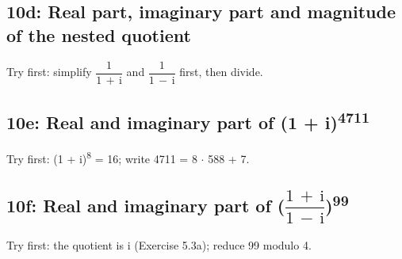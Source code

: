 \documentclass[11pt]{article}
\begin{document}
\begin{keepsection}
\begin{keepsection}
\end{keepsection}

\begin{keepsection}
\subsection{10d: Real part, imaginary part and magnitude of the nested quotient}

Try first: simplify {\small\ensuremath{\dfrac{1}{1\, +\, \mathrm{i}}}} and {\small\ensuremath{\dfrac{1}{1\, -\, \mathrm{i}}}} first, then divide.

\end{keepsection}

\begin{keepsection}
\subsection{10e: Real and imaginary part of (1 + i)\textsuperscript{4711}}

Try first: (1 + i)\textsuperscript{8} = 16; write 4711 = 8 \ensuremath{\cdot} 588 + 7.

\end{keepsection}

\begin{keepsection}
\subsection{10f: Real and imaginary part of ({\small\ensuremath{\dfrac{1\, +\, \mathrm{i}}{1\, -\, \mathrm{i}}}})\textsuperscript{99}}

Try first: the quotient is i (Exercise 5.3a); reduce 99 modulo 4.

\end{keepsection}
\end{keepsection}
\end{document}
